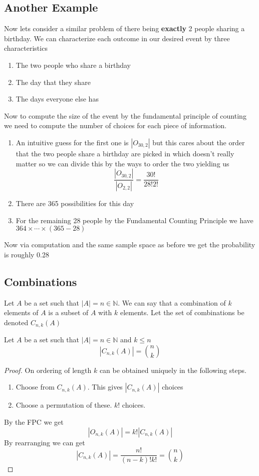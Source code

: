 \documentclass{article}
\begin{document}
\subsection{Another Example}
Now lets consider a similar problem of there being \textbf{exactly} 2 people sharing a birthday. We can characterize each outcome in our desired event by three characteristics
\begin{enumerate}
    \item The two people who share a birthday
    \item The day that they share
    \item The days everyone else has
\end{enumerate}
Now to compute the size of the event by the fundamental principle of counting we need to compute the number of choices for each piece of information.
\begin{enumerate}
    \item An intuitive guess for the first one is $|O_{30,2}|$ but this cares about the order that the two people share a birthday are picked in which doesn't really matter so we can divide this by the ways to order the two yielding us \[\frac{|O_{30,2}|}{|O_{2,2}|} = \frac{30!}{28!2!}\]
    \item There are 365 possibilities for this day
    \item For the remaining 28 people by the Fundamental Counting Principle we have $364 \times \cdots \times(365-28)$ 
\end{enumerate}
Now via computation and the same sample space as before we get the probability is roughly 0.28
\subsection{Combinations}
\begin{definition}
    Let $A$ be a set such that $|A| = n  \in \mathbb{N}$. We can say that a combination of $k$ elements of $A$ is a subset of $A$ with $k$ elements. Let the set of combinations be denoted $C_{n,k}(A)$
\end{definition}
\begin{proposition}
    Let $A$ be a set such that $|A| = n  \in \mathbb{N}$ and $k \le n$
    \[|C_{n,k}(A)| = {{n}\choose{k}}\]
\end{proposition}
\begin{proof}
    On ordering of length $k$ can be obtained uniquely in the following steps.
    \begin{enumerate}
        \item Choose from $C_{n,k}(A)$. This gives $|C_{n,k}(A)|$ choices 
        \item Choose a permutation of these. $k!$ choices.
    \end{enumerate}
    By the FPC we get 
    \[|O_{n,k}(A)| = k!|C_{n,k}(A)|\]
    By rearranging we can get
    \[|C_{n,k}(A)| = \frac{n!}{(n-k)!k!} = {n\choose{k}}\]
\end{proof}
\end{document}
